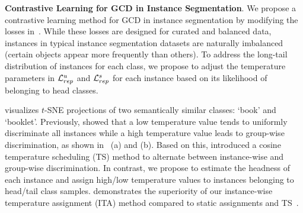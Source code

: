 



\vspace{1mm}
\noindent \textbf{Contrastive Learning for GCD in Instance Segmentation}. 
We propose a contrastive learning method for GCD in instance segmentation by modifying the losses in~. While these losses are designed for curated and balanced data, instances in typical instance segmentation datasets are naturally imbalanced (\ie certain objects appear more frequently than others). To address the long-tail distribution of instances for each class, we propose to adjust the temperature parameters in $\mathcal{L}^u_{rep}$ and $\mathcal{L}^s_{rep}$ for each instance based on its likelihood of belonging to head classes. 



 visualizes $t$-SNE projections of two semantically similar classes: `book' and `booklet'. Previously, \cite{kukleva2023temperature} showed that a low temperature value tends to uniformly discriminate all instances while a high temperature value leads to group-wise discrimination, as shown in~ (a) and (b). Based on this, \cite{kukleva2023temperature} introduced a cosine temperature scheduling (TS) method to alternate between instance-wise and group-wise discrimination. In contrast, we propose to estimate the headness of each instance and assign high/low temperature values to instances belonging to head/tail class samples.  demonstrates the superiority of our instance-wise temperature assignment (ITA) method compared to static assignments and TS~\cite{kukleva2023temperature}.


